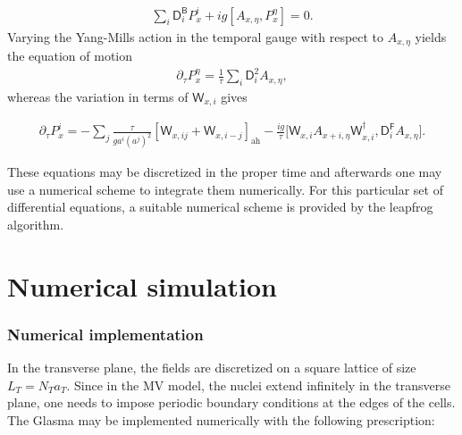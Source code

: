 \begin{align*}
    \sum_{i} \textsf{D}_{i}^{\textsf{B}} P_{x}^{i}+i g\left[A_{x, \eta}, P_{x}^{\eta}\right]=0.
\end{align*}
Varying the Yang-Mills action in the temporal gauge with respect to $A_{x,\eta}$ yields the equation of motion
\begin{align*}
    \partial_{\tau} P_{x}^{\eta}=\frac{1}{\tau} \sum_{i} \textsf{D}_{i}^{2} A_{x, \eta},
\end{align*}
whereas the variation in terms of $\textsf{W}_{x,i}$ gives

\vspace{0.5cm}

\begin{fullwidth}
\begin{align*}
    \partial_{\tau} P_{x}^{i}=-\sum_{j} \frac{\tau}{g a^{i}(a^{j})^{2}}\left[\textsf{W}_{x, i j}+\textsf{W}_{x, i-j}\right]_{\mathrm{ah}}-\frac{i g}{\tau}\big[\textsf{W}_{x,i}A_{x+i,\eta}\textsf{W}^\dagger_{x,i}, \textsf{D}_{i}^{\textsf{F}} A_{x, \eta}\big].
\end{align*}
\end{fullwidth}
These equations may be discretized in the proper time and afterwards one may use a numerical scheme to integrate them numerically. For this particular set of differential equations, a suitable numerical scheme is provided by the {\sffamily\color{ming}leapfrog algorithm}.

\section{Numerical simulation}

\subsubsection*{Numerical implementation}
In the transverse plane, the fields are discretized on a square lattice of size$L_T=N_Ta_T$. Since in the {\sffamily MV} model, the nuclei extend infinitely in the transverse plane, one needs to impose periodic boundary conditions at the edges of the cells. The Glasma may be implemented numerically with the following prescription:

